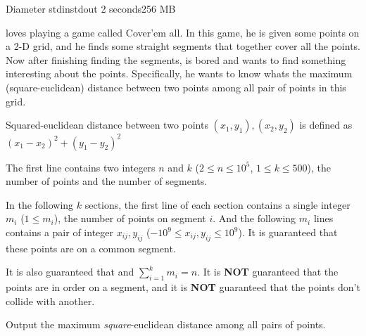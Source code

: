 \begin{problem}{Diameter}
{stdin}{stdout}
{2 seconds}{256 MB}{}

\pittoresque loves playing a game called Cover'em all. In this game, he is given some points on a 2-D grid, and he finds some straight segments that together cover all the points. Now after finishing finding the segments, \pittoresque is bored and wants to find something interesting about the points. Specifically, he wants to know whats the maximum (square-euclidean) distance between two points among all pair of points in this grid.

Squared-euclidean distance between two points $(x_1, y_1), (x_2, y_2)$ is defined as $(x_1 - x_2)^2 + (y_1 - y_2)^2$

\InputFile

The first line contains two integers $n$ and $k$ ($2 \le n \le 10^5$, $1 \le k \le 500$), the number of points and the number of segments.

In the following $k$ sections, the first line of each section contains a single integer $m_i$ ($1 \le m_i$), the number of points on segment $i$. And the following $m_i$ lines contains a pair of integer $x_{ij}, y_{ij}$ ($-10^9 \le x_{ij}, y_{ij} \le 10^9$). It is guaranteed that these points are on a common segment.

It is also guaranteed that and $\sum_{i = 1}^{k} m_i = n$. It is \textbf{NOT} guaranteed that the points are in order on a segment, and it is \textbf{NOT} guaranteed that the points don't collide with another.

\OutputFile

Output the maximum \textit{square}-euclidean distance among all pairs of points.

\Examples

\begin{example}
%
\end{example}

\begin{example}
%
\end{example}



\end{problem}

